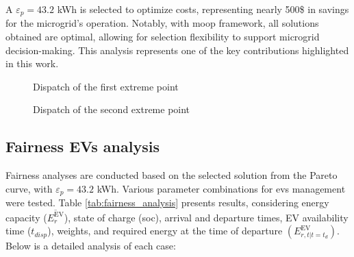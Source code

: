 \documentclass[preprint, 12pt, 3p]{elsarticle}
\begin{document}
A $\varepsilon_{p} = 43.2$ kWh is selected to optimize costs, 
representing nearly 500\$ in savings for the microgrid’s operation. Notably, with \gls{moop} framework, all solutions obtained are optimal, allowing for selection flexibility to support microgrid decision-making. This analysis represents one of the key contributions highlighted in this work.


\begin{figure}
    \centering
    
    \caption{Dispatch of the first extreme point}
    \label{fig:first_extreme_point}
\end{figure}

\begin{figure}[h!]
    \centering
    
    \caption{Dispatch of the second extreme point}
    \label{fig:second_extreme_point}
\end{figure}

\subsection{Fairness EVs analysis}\label{subsec:ev_fairness_analysis}

Fairness analyses are conducted based on the selected solution from the Pareto curve, with $\varepsilon_{p} = 43.2$ kWh. Various parameter combinations for \glspl{ev} management were tested. 
Table \ref{tab:fairness_analysis} presents results, considering energy capacity ($\overline{{E}^{\text{EV}}_{r}}$), state of charge (\gls{soc}), arrival and departure times, EV availability time
($t_{disp}$), weights, and required energy at the time of departure 
$(E^{\text{EV}}_{r,t|t={t_d}})$. Below is a detailed analysis of each case:
\end{document}
